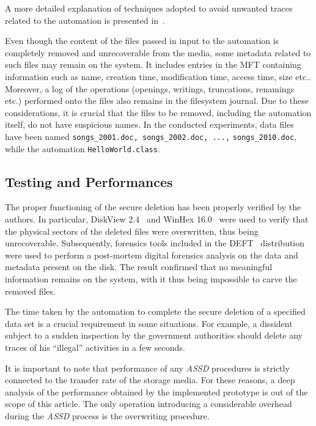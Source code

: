 \documentclass[10pt, conference, compsocconf]{IEEEtran}
\newcommand{\assd}{\emph{ASSD}\xspace}
\begin{document}
\noindent A more detailed explanation of techniques adopted to avoid unwanted traces related to the automation is presented in~\cite{autoalibi}.

Even though the content of the files passed in input to the automation is completely removed and unrecoverable from the media, some metadata related to such files may remain on the system. It includes entries in the MFT containing information such as name, creation time, modification time, access time, size etc.. Moreover, a log of the operations (openings, writings, truncations, renamings etc.) performed onto the files also remains in the filesystem journal. Due to these considerations, it is crucial that the files to be removed, including the automation itself, do not have suspicious names.
In the conducted experiments, data files have been named \verb=songs_2001.doc, songs_2002.doc, ...,= \verb=songs_2010.doc=, while the automation \verb=HelloWorld.class=.


\subsection{Testing and Performances}

The proper functioning of the secure deletion has been properly verified by the authors.
In particular, DiskView 2.4~\cite{diskview} and WinHex 16.0~\cite{winhex} were used to verify that the physical sectors of the deleted files were overwritten, thus being unrecoverable. Subsequently, forensics tools included in the DEFT~\cite{deft} distribution were used to perform a post-mortem digital forensics analysis on the data and metadata present on the disk. The result confirmed that no meaningful information remains on the system, with it thus being impossible to carve the removed files.


\vspace{0.15cm}
The time taken by the automation to complete the secure deletion of a specified data set is a crucial requirement in some situations. For example, a dissident subject to a sudden inspection by the government authorities should delete any traces of his ``illegal'' activities in a few seconds.

It is important to note that performance of any \assd procedures is strictly connected to the transfer rate of the storage media.
For these reasons, a deep analysis of the performance obtained by the implemented prototype is out of the scope of this article. The only operation introducing a considerable overhead during the \assd process is the overwriting procedure.
\end{document}
